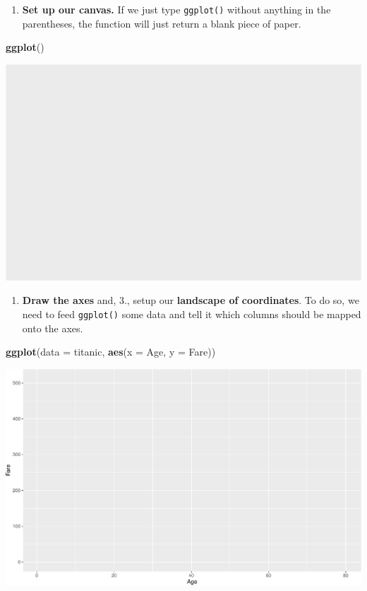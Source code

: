 \documentclass[]{book}
\newenvironment{Shaded}{\begin{snugshade}}{\end{snugshade}}
\newcommand{\DataTypeTok}[1]{\textcolor[rgb]{0.13,0.29,0.53}{#1}}
\newcommand{\KeywordTok}[1]{\textcolor[rgb]{0.13,0.29,0.53}{\textbf{#1}}}
\newcommand{\NormalTok}[1]{#1}
\providecommand{\tightlist}{%
  \setlength{\itemsep}{0pt}\setlength{\parskip}{0pt}}
\begin{document}
\begin{enumerate}
\def\labelenumi{(\arabic{enumi})}
\tightlist
\item
  \textbf{Set up our canvas.} If we just type \texttt{ggplot()} without anything in the parentheses, the function will just return a blank piece of paper.
\end{enumerate}

\begin{Shaded}
\begin{Highlighting}[]
\KeywordTok{ggplot}\NormalTok{()}
\end{Highlighting}
\end{Shaded}

\includegraphics{figures/unnamed-chunk-247-1.pdf}

\begin{enumerate}
\def\labelenumi{(\arabic{enumi})}
\setcounter{enumi}{1}
\tightlist
\item
  \textbf{Draw the axes} and, 3., setup our \textbf{landscape of coordinates}. To do so, we need to feed \texttt{ggplot()} some data and tell it which columns should be mapped onto the axes.
\end{enumerate}

\begin{Shaded}
\begin{Highlighting}[]
\KeywordTok{ggplot}\NormalTok{(}\DataTypeTok{data =}\NormalTok{ titanic, }
       \KeywordTok{aes}\NormalTok{(}\DataTypeTok{x =}\NormalTok{ Age, }\DataTypeTok{y =}\NormalTok{ Fare))}
\end{Highlighting}
\end{Shaded}

\includegraphics{figures/unnamed-chunk-248-1.pdf}
\end{document}
